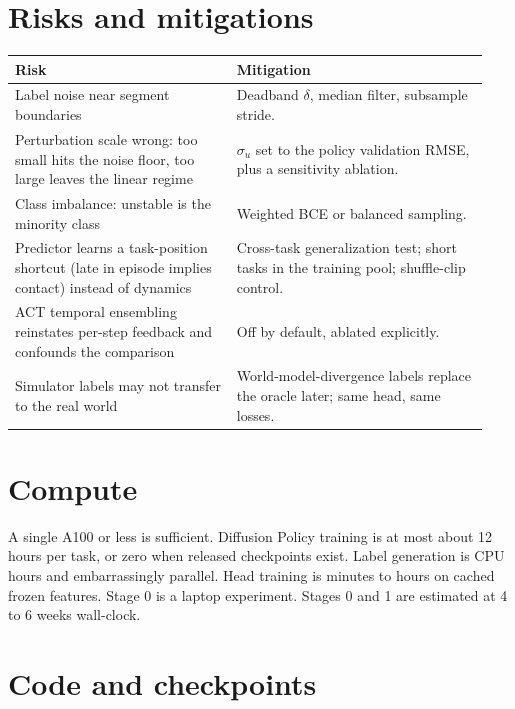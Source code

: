 \documentclass[11pt]{article}
\begin{document}
\section{Risks and mitigations}

\begin{center}
\begin{tabular}{@{}p{0.44\linewidth}p{0.5\linewidth}@{}}
\toprule
Risk & Mitigation \\
\midrule
Label noise near segment boundaries &
Deadband $\delta$, median filter, subsample stride. \\
\addlinespace
Perturbation scale wrong: too small hits the noise floor, too large leaves the linear
regime &
$\sigma_u$ set to the policy validation RMSE, plus a sensitivity ablation. \\
\addlinespace
Class imbalance: unstable is the minority class &
Weighted BCE or balanced sampling. \\
\addlinespace
Predictor learns a task-position shortcut (late in episode implies contact) instead of
dynamics &
Cross-task generalization test; short tasks in the training pool; shuffle-clip control. \\
\addlinespace
ACT temporal ensembling reinstates per-step feedback and confounds the comparison &
Off by default, ablated explicitly. \\
\addlinespace
Simulator labels may not transfer to the real world &
World-model-divergence labels replace the oracle later; same head, same losses. \\
\bottomrule
\end{tabular}
\end{center}

\section{Compute}

A single A100 or less is sufficient. Diffusion Policy training is at most about 12
hours per task, or zero when released checkpoints exist. Label generation is CPU hours
and embarrassingly parallel. Head training is minutes to hours on cached frozen
features. Stage 0 is a laptop experiment. Stages 0 and 1 are estimated at 4 to 6 weeks
wall-clock.

\section{Code and checkpoints}
\end{document}
